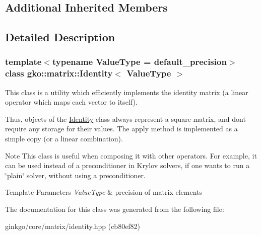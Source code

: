 \subsection*{Additional Inherited Members}


\subsection{Detailed Description}
\subsubsection*{template$<$typename Value\+Type = default\+\_\+precision$>$\newline
class gko\+::matrix\+::\+Identity$<$ Value\+Type $>$}

This class is a utility which efficiently implements the identity matrix (a linear operator which maps each vector to itself). 

Thus, objects of the \hyperlink{classgko_1_1matrix_1_1Identity}{Identity} class always represent a square matrix, and don\textquotesingle{}t require any storage for their values. The apply method is implemented as a simple copy (or a linear combination).

\begin{DoxyNote}{Note}
This class is useful when composing it with other operators. For example, it can be used instead of a preconditioner in Krylov solvers, if one wants to run a \char`\"{}plain\char`\"{} solver, without using a preconditioner.
\end{DoxyNote}

\begin{DoxyTemplParams}{Template Parameters}
{\em Value\+Type} & precision of matrix elements \\
\hline
\end{DoxyTemplParams}


The documentation for this class was generated from the following file\+:\begin{DoxyCompactItemize}
\item 
ginkgo/core/matrix/identity.\+hpp (cb80ef82)\end{DoxyCompactItemize}
